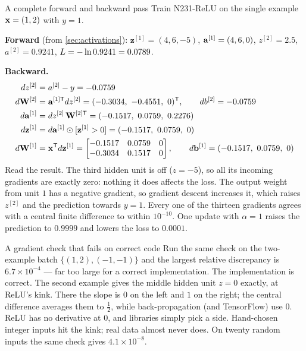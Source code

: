 \begin{workedexample}{A complete forward and backward pass}
Train N231-ReLU on the single example $\mathbf{x} = (1,2)$ with $y = 1$.

\textbf{Forward} (from \cref{sec:activations}): $\mathbf{z}^{[1]} = (4, 6, -5)$,
$\mathbf{a}^{[1]} = (4, 6, 0)$, $z^{[2]} = 2.5$, $a^{[2]} = 0.9241$,
$L = -\ln 0.9241 = 0.0789$.

\textbf{Backward.}
\begin{align*}
  dz^{[2]} &= a^{[2]} - y = -0.0759\\
  d\Wl{2} &= \va^{[1]\mathsf{T}}dz^{[2]} = (-0.3034,\ -0.4551,\ 0)^{\mathsf{T}},
  \qquad db^{[2]} = -0.0759\\
  d\va^{[1]} &= dz^{[2]}\,\mathbf{W}^{[2]\mathsf{T}} = (-0.1517,\ 0.0759,\ 0.2276)\\
  d\mathbf{z}^{[1]} &= d\va^{[1]}\odot[\mathbf{z}^{[1]} > 0] = (-0.1517,\ 0.0759,\ 0)\\
  d\Wl{1} &= \vx^{\mathsf{T}}d\mathbf{z}^{[1]}
  = \begin{bmatrix}-0.1517 & 0.0759 & 0\\ -0.3034 & 0.1517 & 0\end{bmatrix},
  \qquad d\bl{1} = (-0.1517,\ 0.0759,\ 0)
\end{align*}
Read the result. The third hidden unit is off ($z = -5$), so all its incoming
gradients are exactly zero: nothing it does affects the loss. The output weight
from unit $1$ has a negative gradient, so gradient descent increases it, which
raises $z^{[2]}$ and the prediction towards $y = 1$. Every one of the thirteen
gradients agrees with a central finite difference to within $10^{-10}$. One
update with $\alpha = 1$ raises the prediction to $0.9999$ and lowers the loss to
$0.0001$.
\end{workedexample}

\begin{pitfall}{A gradient check that fails on correct code}
Run the same check on the two-example batch $\{(1,2), (-1,-1)\}$ and the largest
relative discrepancy is $6.7\times10^{-4}$ --- far too large for a correct
implementation. The implementation is correct. The second example gives the
middle hidden unit $z = 0$ exactly, at ReLU's kink. There the slope is $0$ on the
left and $1$ on the right; the central difference averages them to
$\frac12$, while back-propagation (and TensorFlow) use $0$. ReLU has no
derivative at $0$, and libraries simply pick a side. Hand-chosen integer inputs
hit the kink; real data almost never does. On twenty random inputs the same
check gives $4.1\times10^{-8}$.
\end{pitfall}

